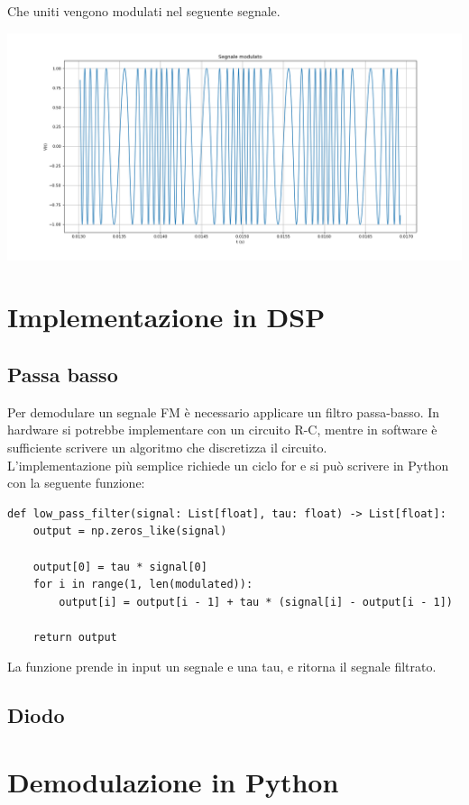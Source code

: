 \documentclass{article}
\begin{document}
\newpage
Che uniti vengono modulati nel seguente segnale.

\begin{center}
    \includegraphics[width=\textwidth]{modulato.png}
\end{center}


\section{Implementazione in DSP}
\subsection{Passa basso}
Per demodulare un segnale FM è necessario applicare un filtro passa-basso. In hardware si potrebbe implementare
con un circuito R-C, mentre in software è sufficiente scrivere un algoritmo che discretizza il circuito.\\
L'implementazione più semplice richiede un ciclo for e si può scrivere in Python con la seguente funzione:

\begin{verbatim}
def low_pass_filter(signal: List[float], tau: float) -> List[float]:
    output = np.zeros_like(signal)

    output[0] = tau * signal[0]
    for i in range(1, len(modulated)):
        output[i] = output[i - 1] + tau * (signal[i] - output[i - 1])

    return output
\end{verbatim}

La funzione prende in input un segnale e una tau, e ritorna il segnale filtrato.

\subsection{Diodo}

\section{Demodulazione in Python}
\end{document}
